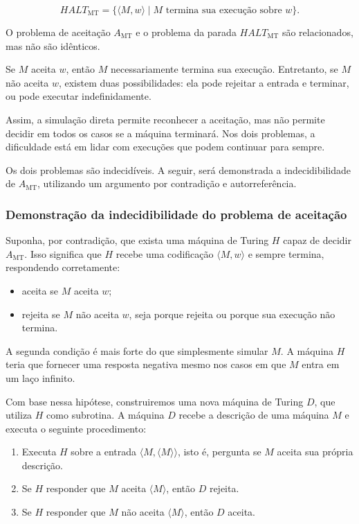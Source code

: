 \documentclass[
  brazilian,
  letterpaper,
]{book}
\providecommand{\tightlist}{%
  \setlength{\itemsep}{0pt}\setlength{\parskip}{0pt}}
\theoremstyle{plain}
\theoremstyle{definition}
\theoremstyle{remark}
\begin{document}
\[
HALT_{\mathrm{MT}}=\{\langle M,w\rangle\mid M\text{ termina sua execução sobre }w\}.
\]

O problema de aceitação \(A_{\mathrm{MT}}\) e o problema da parada
\(HALT_{\mathrm{MT}}\) são relacionados, mas não são idênticos.

Se \(M\) aceita \(w\), então \(M\) necessariamente termina sua execução.
Entretanto, se \(M\) não aceita \(w\), existem duas possibilidades: ela
pode rejeitar a entrada e terminar, ou pode executar indefinidamente.

Assim, a simulação direta permite reconhecer a aceitação, mas não
permite decidir em todos os casos se a máquina terminará. Nos dois
problemas, a dificuldade está em lidar com execuções que podem continuar
para sempre.

Os dois problemas são indecidíveis. A seguir, será demonstrada a
indecidibilidade de \(A_{\mathrm{MT}}\), utilizando um argumento por
contradição e autorreferência.

\subsubsection{Demonstração da indecidibilidade do problema de
aceitação}\label{demonstrauxe7uxe3o-da-indecidibilidade-do-problema-de-aceitauxe7uxe3o}

Suponha, por contradição, que exista uma máquina de Turing \(H\) capaz
de decidir \(A_{\mathrm{MT}}\). Isso significa que \(H\) recebe uma
codificação \(\langle M,w\rangle\) e sempre termina, respondendo
corretamente:

\begin{itemize}
\tightlist
\item
  aceita se \(M\) aceita \(w\);
\item
  rejeita se \(M\) não aceita \(w\), seja porque rejeita ou porque sua
  execução não termina.
\end{itemize}

A segunda condição é mais forte do que simplesmente simular \(M\). A
máquina \(H\) teria que fornecer uma resposta negativa mesmo nos casos
em que \(M\) entra em um laço infinito.

Com base nessa hipótese, construiremos uma nova máquina de Turing \(D\),
que utiliza \(H\) como subrotina. A máquina \(D\) recebe a descrição de
uma máquina \(M\) e executa o seguinte procedimento:

\begin{enumerate}
\def\labelenumi{\arabic{enumi}.}
\tightlist
\item
  Executa \(H\) sobre a entrada \(\langle M,\langle M\rangle\rangle\),
  isto é, pergunta se \(M\) aceita sua própria descrição.
\item
  Se \(H\) responder que \(M\) aceita \(\langle M\rangle\), então \(D\)
  rejeita.
\item
  Se \(H\) responder que \(M\) não aceita \(\langle M\rangle\), então
  \(D\) aceita.
\end{enumerate}
\end{document}
